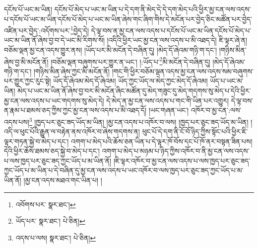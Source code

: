 དངོས་པོ་ཡང་མ་ཡིན། དངོས་པོ་མེད་པ་ཡང་མ་ཡིན་པ་དེ་དག་ནི་མེད་དེ་དེ་དག་མེད་པའི་ཕྱིར་མྱ་ངན་ལས་འདས་པ་དངོས་པོ་ཡང་མ་ཡིན་དངོས་པོ་མེད་པ་ཡང་མ་ཡིན་ཞེས་གང་ཞིག་གིས་དེ་མངོན་པར་བྱེད་ཅིང་མཚོན་པར་བྱེད་འཛིན་པར་བྱེད་:འདོགས་པར་\footnote{འབོགས་པར་  སྣར་ཐང་། }བྱེད་དེ། དེ་ལྟ་བས་ན་མྱ་ངན་ལས་འདས་པ་དངོས་པོ་ཡང་མ་ཡིན་དངོས་པོ་མེད་པ་ཡང་མ་ཡིན་ནོ་ཞེས་བྱ་བ་དེ་ཡང་མི་རིགས་སོ། །འདིའི་ཕྱིར་ཡང་མྱ་ངན་ལས་འདས་པ་མི་འཐད་དེ། ཇི་ལྟར་ཞེ་ན། བཅོམ་ལྡན་མྱ་ངན་འདས་གྱུར་ནས། །ཡོད་པར་མི་མངོན་དེ་བཞིན་དུ། །མེད་དོ་ཞེའམ་གཉི་ག་དང་། །གཉིས་མིན་ཞེས་བྱ་མི་མངོན་ནོ། །བཅོམ་ལྡན་བཞུགས་པར་གྱུར་ན་ཡང་། །:ཡོད་པ་\footnote{ཡོད་པར་  སྣར་ཐང་།  པེ་ཅིན། }མི་མངོན་དེ་བཞིན་དུ། །མེད་དོ་ཞེའམ་གཉི་ག་དང་། །གཉིས་མིན་ཞེས་ཀྱང་མི་མངོན་ནོ། །གང་གི་ཕྱིར་བཅོམ་ལྡན་འདས་མྱ་ངན་ལས་འདས་སམ་བཞུགས་པར་གྱུར་ཀྱང་རུང་སྟེ། ཡོད་དོ་ཞེའམ་མེད་དོ་ཞེའམ། ཡོད་ཀྱང་ཡོད་ལ་མེད་ཀྱང་མེད་དོ་ཞེའམ། ཡོད་པ་ཡང་མ་ཡིན། མེད་པ་ཡང་མ་ཡིན་ནོ་ཞེས་བྱ་བར་མི་མངོན་ཞིང་མཚོན་དུ་མེད་གཟུང་དུ་མེད་གདགས་སུ་མེད་པ་དེའི་ཕྱིར་མྱ་ངན་ལས་འདས་པ་ཡང་གདགས་སུ་མེད་དེ། དེ་མེད་ན་མྱ་ངན་ལས་འདས་པ་གང་གི་ཡིན་པར་འགྱུར། དེ་ལྟ་བས་ན་རྣམ་པ་ཐམས་ཅད་ཀྱིས་ཀྱང་མྱ་ངན་ལས་འདས་པ་མི་འཐད་དོ། །ཡང་གཞན་ཡང་། འཁོར་བ་མྱ་ངན་:ལས་འདས་པས།\footnote{འདས་པ་ལས།  སྣར་ཐང་།  པེ་ཅིན། } །ཁྱད་པར་ཅུང་ཟད་ཡོད་མ་ཡིན། །མྱ་ངན་འདས་པ་འཁོར་བ་ལས། །ཁྱད་པར་ཅུང་ཟད་ཡོད་མ་ཡིན། །འདི་ལ་ཕུང་པོའི་རྒྱུན་ལ་བརྟེན་ནས་འཁོར་བ་ཞེས་གདགས་ན། ཕུང་པོ་དེ་དག་ནི་ངོ་བོ་ཉིད་ཀྱིས་སྟོང་པའི་ཕྱིར་ཇི་ལྟར་གཏན་སྐྱེ་བ་མེད་པ་དང་། འགག་པ་མེད་པའི་ཆོས་ཅན་ཡིན་པ་དེ་ལྟར་ཁོ་བོས་དང་པོ་ཁོ་ནར་བསྟན་ཟིན་པས། དེའི་ཕྱིར་ཆོས་ཐམས་ཅད་སྐྱེ་བ་མེད་པ་དང་། འགག་པ་མེད་པ་མཉམ་པ་ཉིད་ཀྱིས་འཁོར་བ་ནི་མྱ་ངན་ལས་འདས་པ་ལས་ཁྱད་པར་ཅུང་ཟད་ཀྱང་ཡོད་པ་མ་ཡིན་ནོ། །ཇི་ལྟར་འཁོར་བ་མྱ་ངན་ལས་འདས་པ་ལས་ཁྱད་པར་ཅུང་ཟད་ཀྱང་ཡོད་པ་མ་ཡིན་པ་དེ་བཞིན་དུ་མྱ་ངན་ལས་འདས་པ་ཡང་འཁོར་བ་ལས་ཁྱད་པར་ཅུང་ཟད་ཀྱང་ཡོད་པ་མ་ཡིན་ནོ། །མྱ་ངན་འདས་མཐའ་གང་ཡིན་པ། །
